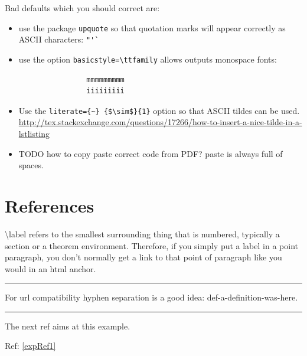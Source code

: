\documentclass[12pt]{article}
\newcommand{\inOut}[1]{#1}                                %
\begin{document}
    Bad defaults which you should correct are:

    \begin{itemize}

        \item use the package \lstinline|upquote| so that quotation marks will appear
            correctly as ASCII characters: \lstinline|"'`|

        \item use the option \lstinline|basicstyle=\ttfamily| allows outputs monospace fonts:

            \begin{lstlisting}
                mmmmmmmmm
                iiiiiiiii
            \end{lstlisting}

        \item Use the \lstinline|literate={~} {$\sim$}{1}| option so that ASCII tildes can be used.
            \url{http://tex.stackexchange.com/questions/17266/how-to-insert-a-nice-tilde-in-a-lstlisting}

        \item TODO how to copy paste correct code from PDF? paste is always full of spaces.

    \end{itemize}

\section{References}\label{secRef}

    \begin{remark} \label{remLab1}
        \textbackslash{}label refers to the smallest surrounding thing that is numbered, typically a section or a theorem environment. Therefore, if you simply put a label in a point paragraph, you don't normally get a link to that point of paragraph like you would in an html anchor.
    \end{remark}\hrule

    \begin{remark} \label{remLab2}
        For url compatibility hyphen separation is a good idea: def-a-definition-was-here.
    \end{remark}\hrule

    \begin{example} \label{expRef1}
        \inOut{
            The next ref aims at this example.

            Ref: \ref{expRef1}
        }
    \end{example}
\end{document}
